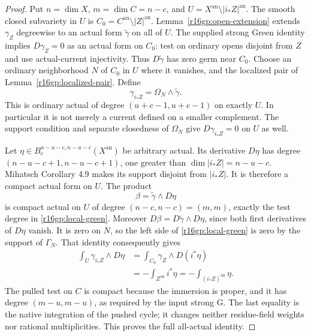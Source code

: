 \begin{proof}
Put $n=\dim X$, $m=\dim C=n-c$, and
$U=X^{\mathrm{an}}\setminus|i_*Z|^{\mathrm{an}}$.
The smooth closed subvariety in $U$ is
$C_0=C^{\mathrm{an}}\setminus|Z|^{\mathrm{an}}$.
Lemma~\ref{r16gp:open-extension} extends $\gamma_Z$ degreewise
to an actual form $\widetilde\gamma$ on all of $U$.
The supplied strong Green identity implies
$D\gamma_Z=0$ as an actual form on $C_0$: test on ordinary opens
disjoint from $Z$ and use actual-current injectivity.
Thus $D\widetilde\gamma$ has zero germ near $C_0$.
Choose an ordinary neighborhood $N$ of $C_0$ in $U$ where it
vanishes, and the localized pair of
Lemma~\ref{r16gp:localized-pair}.  Define
\[
                   \gamma_{i_*Z}=\Omega_N\wedge\widetilde\gamma.
 \tag{GP16.4}\label{r16gp:construction}
\]
This is ordinary actual of degree $(u+c-1,u+c-1)$ on exactly
$U$.  In particular it is not merely a current defined on a
smaller complement.  The support condition and separate closedness
of $\Omega_N$ give $D\gamma_{i_*Z}=0$ on $U$ as well.

Let $\eta\in B_c^{n-u-c,n-u-c}(X^{\mathrm{an}})$ be arbitrary
actual.  Its derivative $D\eta$ has degree
$(n-u-c+1,n-u-c+1)$, one greater than
$\dim|i_*Z|=n-u-c$.  Mihatsch Corollary 4.9 makes its support
disjoint from $|i_*Z|$.  It is therefore a compact actual form
on $U$.  The product
\[
                    \beta=\widetilde\gamma\wedge D\eta
\]
is compact actual on $U$ of degree $(n-c,n-c)=(m,m)$, exactly
the test degree in \eqref{r16gp:local-green}.  Moreover
$D\beta=D\widetilde\gamma\wedge D\eta$, since both first
derivatives of $D\eta$ vanish.  It is zero on $N$, so the
left side of \eqref{r16gp:local-green} is zero by the support
of $\Gamma_N$.  That identity consequently gives
\[
\begin{split}
 \int_U\gamma_{i_*Z}\wedge D\eta
  &=\int_{C_0}\gamma_Z\wedge D(i^*\eta)\\
  &=-\int_{Z^{\mathrm{an}}}i^*\eta
   =-\int_{(i_*Z)^{\mathrm{an}}}\eta.
\end{split}
 \tag{GP16.5}\label{r16gp:pairing}
\]
The pulled test on $C$ is compact because the immersion is proper,
and it has degree $(m-u,m-u)$, as required by the input strong G.
The last equality is the native integration of the pushed cycle;
it changes neither residue-field weights nor rational multiplicities.
This proves the full all-actual identity.
\end{proof}

